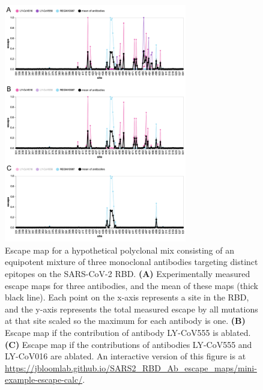 \documentclass[9pt,twocolumn,twoside]{gsajnl_modified}
\begin{document}
\begin{figure}
\includegraphics[width=0.71\textwidth]{figures/mini_example/mini_example.pdf} 

\caption{
Escape map for a hypothetical polyclonal mix consisting of an equipotent mixture of three monoclonal antibodies targeting distinct epitopes on the SARS-CoV-2 RBD.
{\bf (A)} Experimentally measured escape maps for three antibodies, and the mean of these maps (thick black line).
Each point on the x-axis represents a site in the RBD, and the y-axis represents the total measured escape by all mutations at that site scaled so the maximum for each antibody is one.
{\bf (B)} Escape map if the contribution of antibody LY-CoV555 is ablated.
{\bf (C)} Escape map if the contributions of antibodies LY-CoV555 and LY-CoV016 are ablated.
An interactive version of this figure is at \url{https://jbloomlab.github.io/SARS2_RBD_Ab_escape_maps/mini-example-escape-calc/}.}
\label{fig:mini_example}
\end{figure}
\end{document}
